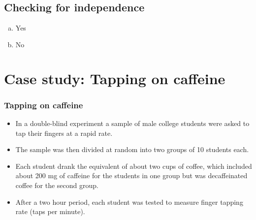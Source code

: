 \documentclass[slidestop,compress,mathserif,11pt,t,professionalfonts,xcolor=table]{beamer}
\begin{document}

\subsection{Checking for independence}

\begin{frame}


\begin{multicols}{2}
\begin{enumerate}[(a)]
\item Yes
\item No
\end{enumerate}
\end{multicols}

\end{frame}


\section{Case study: Tapping on caffeine}


\begin{frame}
\frametitle{Tapping on caffeine}

\begin{itemize}

\item In a double-blind experiment a sample of male college students were asked to tap their fingers at a rapid rate. 

\item The sample was then divided at random into two groups of 10 students each. 

\item Each student drank the equivalent of about two cups of coffee, which included about 200 mg of caffeine for the students in one group but was decaffeinated coffee for the second group. 

\item After a two hour period, each student was tested to measure finger tapping rate (taps per minute). 

\end{itemize}

\end{frame}
\end{document}
